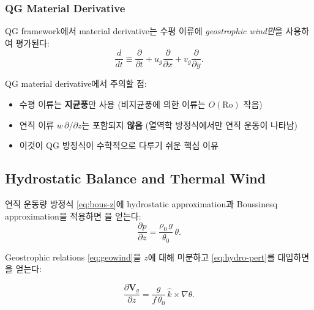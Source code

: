 
\subsubsection{QG Material Derivative}

QG framework에서 material derivative는 수평 이류에
\emph{geostrophic wind만}을 사용하여 평가된다:
\begin{equation}\label{eq:qg-ddt}
  \frac{d}{dt}
  \equiv \frac{\partial}{\partial t}
       + u_g\frac{\partial}{\partial x}
       + v_g\frac{\partial}{\partial y}.
\end{equation}

\begin{hisublock}
QG material derivative에서 주의할 점:
\begin{itemize}
  \item 수평 이류는 \textbf{지균풍}만 사용 (비지균풍에 의한 이류는 $O(\mathrm{Ro})$ 작음)
  \item 연직 이류 $w\,\partial/\partial z$는 포함되지 \textbf{않음}
        (열역학 방정식에서만 연직 운동이 나타남)
  \item 이것이 QG 방정식이 수학적으로 다루기 쉬운 핵심 이유
\end{itemize}
\end{hisublock}

\subsection{Hydrostatic Balance and Thermal Wind}\label{subsec:thermal-wind}

연직 운동량 방정식 \eqref{eq:bous-z}에 hydrostatic approximation과
Boussinesq approximation을 적용하면 을 얻는다:
\begin{equation}\label{eq:hydro-pert}
  \frac{\partial p}{\partial z} = \frac{\rho_0\,g}{\theta_0}\,\theta.
\end{equation}

\noindent
Geostrophic relations \eqref{eq:geowind}을 $z$에 대해 미분하고
\eqref{eq:hydro-pert}를 대입하면
을 얻는다:

\begin{equation}\label{eq:thermal-wind-ch05}
  \frac{\partial \mathbf{V}_g}{\partial z}
  = \frac{g}{f\,\theta_0}\,\hat{k}\times\nabla\theta.
\end{equation}

